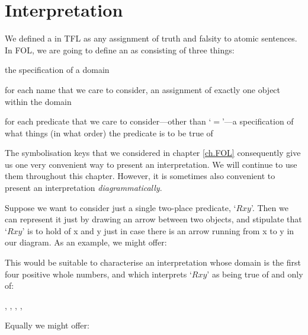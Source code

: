 \section{Interpretation}
We defined a  in TFL as any assignment of truth and falsity to atomic sentences. In FOL, we are going to define an  as consisting of three things:
	\begin{ebullet}	
		\item the specification of a domain
		\item for each name that we care to consider, an assignment of exactly one object within the domain 
		\item for each predicate that we care to consider---other than `$=$'---a specification of what things (in what order) the predicate is to be true of
	\end{ebullet}
The symbolisation keys that we considered in chapter \ref{ch.FOL} consequently give us one very convenient way to present an interpretation. We will continue to use them throughout this chapter. However, it is sometimes also convenient to present an interpretation \emph{diagrammatically}. 


Suppose we want to consider just a single two-place predicate, `$Rxy$'. Then we can represent it just by drawing an arrow between two objects, and stipulate that `$Rxy$' is to hold of x and y just in case there is an arrow running from x to y in our diagram. As an example, we might offer:
\begin{center}
\end{center}
This would be suitable to characterise an interpretation whose domain is the first four positive whole numbers, and which interprets `$Rxy$' as being true of and only of:
	\begin{center}
		, 
		, 
		, 
		, 
	\end{center}
Equally we might offer:

